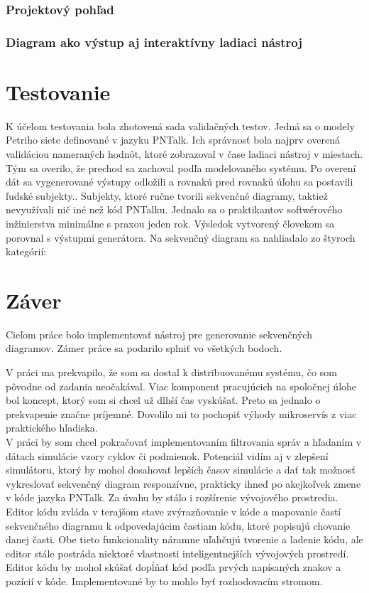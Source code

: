 \subsection{Projektový pohľad}

\subsection{Diagram ako výstup aj interaktívny ladiaci nástroj}

\chapter{Testovanie}

K účelom testovania bola zhotovená sada validačných testov. Jedná sa o modely Petriho siete definované v jazyku PNTalk.
Ich správnosť bola najprv overená validáciou nameraných hodnôt, ktoré zobrazoval v čase ladiaci nástroj v miestach.
Tým sa overilo, že prechod sa zachoval podľa modelovaného systému. Po overení dát sa vygenerované výstupy odložili a rovnakú pred rovnakú úľohu sa postavili ľudské subjekty.. Subjekty, ktoré ručne tvorili sekvenčné diagramy, taktiež nevyužívali nič iné než kód PNTalku. Jednalo sa o praktikantov softwérového inžinierstva minimálne s praxou jeden rok.
Výsledok vytvorený človekom sa porovnal s výstupmi generátora.
Na sekvenčný diagram sa nahliadalo zo štyroch kategórií:

\chapter{Záver}

Cieľom práce bolo implementovať nástroj pre generovanie sekvenčných diagramov. Zámer práce sa podarilo splniť vo všetkých bodoch.

V práci ma prekvapilo, že som sa dostal k distribuovanému systému, čo som pôvodne od zadania neočakával. Viac komponent pracujúcich na spoločnej úlohe bol koncept, ktorý som si chcel už dlhší čas vyskúšať. Preto sa jednalo o prekvapenie značne príjemné. Dovolilo mi to pochopiť výhody mikroservís z viac praktického hľadiska. \\

V práci by som chcel pokračovať implementovaním filtrovania správ a hľadaním v dátach simulácie vzory cyklov či podmienok. Potenciál vidím aj v zlepšení simulátoru, ktorý by mohol dosahovať lepších časov simulácie a dať tak možnosť vykreslovať sekvenčný diagram responzívne, prakticky ihneď po akejkoľvek zmene v kóde jazyka PNTalk. Za úvahu by stálo i rozšírenie vývojového prostredia.
Editor kódu zvláda v terajšom stave zvýrazňovanie v kóde a mapovanie častí sekvenčného diagramu k odpovedajúcim častiam kódu, ktoré popisujú chovanie danej časti. Obe tieto funkcionality náramne uľahčujú tvorenie a ladenie kódu, ale editor stále postráda niektoré vlastnosti inteligentnejších vývojových prostredí. Editor kódu by mohol skúšať dopĺňať kód podľa prvých napísaných znakov a pozícií v kóde. Implementované by to mohlo byť rozhodovacím stromom. 

